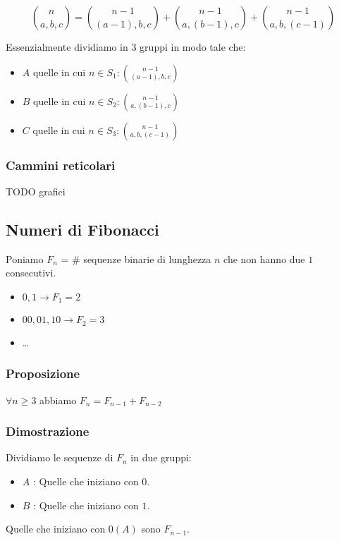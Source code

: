 \documentclass[11pt]{article}
\begin{document}
			\[
				\binom{n}{a, b, c} = \binom{n-1}{(a-1), b, c} + 
				\binom{n-1}{a, (b-1), c} + \binom{n-1}{a, b, (c-1)}
			\]

			Essenzialmente dividiamo in 3 gruppi in modo tale che:

			\begin{itemize}	
				\item $A$ quelle in cui $n \in S_1 : \binom{n-1}{(a-1), b, c}$
				\item $B$ quelle in cui $n \in S_2 : \binom{n-1}{a, (b-1), c}$
				\item $C$ quelle in cui $n \in S_3 : \binom{n-1}{a, b, (c-1)}$
			\end{itemize}
			
			\subsubsection{Cammini reticolari}

			TODO grafici

			\subsection{Numeri di Fibonacci}

			Poniamo $F_n$ = \# sequenze binarie di lunghezza $n$ che non hanno
			due $1$ consecutivi.

			\begin{itemize}
				\item $0,1 \to F_1 = 2$
				\item $00, 01, 10 \to  F_2 = 3$
				\item \ldots 
			\end{itemize}

			\subsubsection{Proposizione}

			$\forall n \geq 3$ abbiamo $F_n = F_{n-1} + F_{n-2}$

			\subsubsection{Dimostrazione}

			Dividiamo le sequenze di $F_n$ in due gruppi:
			\begin{itemize}
				\item $A$ : Quelle che iniziano con $0$.
				\item $B$ : Quelle che iniziano con $1$. 
			\end{itemize}
			Quelle che iniziano con $0 (A)$ sono $F_{n-1}$.
\end{document}
